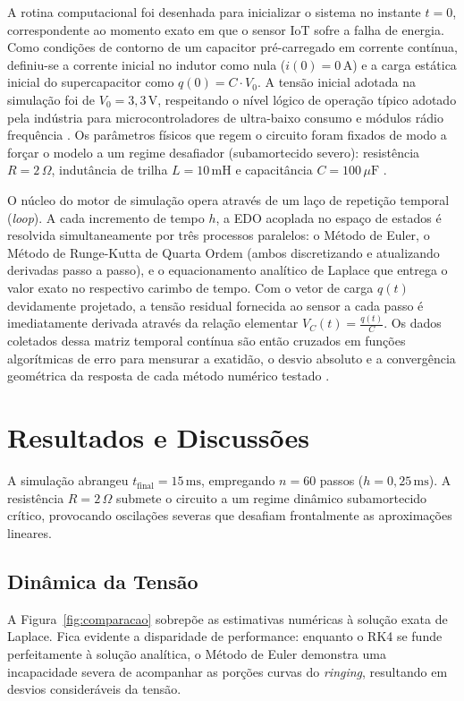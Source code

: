 \documentclass[11pt, a4paper]{article}
\begin{document}
A rotina computacional foi desenhada para inicializar o sistema no instante $t=0$, correspondente ao momento exato em que o sensor IoT sofre a falha de energia. Como condições de contorno de um capacitor pré-carregado em corrente contínua, definiu-se a corrente inicial no indutor como nula ($i(0) = 0\,\text{A}$) e a carga estática inicial do supercapacitor como $q(0) = C \cdot V_0$. A tensão inicial adotada na simulação foi de $V_0 = 3{,}3\,\text{V}$, respeitando o nível lógico de operação típico adotado pela indústria para microcontroladores de ultra-baixo consumo e módulos rádio frequência \cite{sosa2024}. Os parâmetros físicos que regem o circuito foram fixados de modo a forçar o modelo a um regime desafiador (subamortecido severo): resistência $R = 2\,\Omega$, indutância de trilha $L = 10\,\text{mH}$ e capacitância $C = 100\,\mu\text{F}$ \cite{shaikh2022}.

O núcleo do motor de simulação opera através de um laço de repetição temporal (\textit{loop}). A cada incremento de tempo $h$, a EDO acoplada no espaço de estados é resolvida simultaneamente por três processos paralelos: o Método de Euler, o Método de Runge-Kutta de Quarta Ordem (ambos discretizando e atualizando derivadas passo a passo), e o equacionamento analítico de Laplace que entrega o valor exato no respectivo carimbo de tempo. Com o vetor de carga $q(t)$ devidamente projetado, a tensão residual fornecida ao sensor a cada passo é imediatamente derivada através da relação elementar $V_C(t) = \frac{q(t)}{C}$. Os dados coletados dessa matriz temporal contínua são então cruzados em funções algorítmicas de erro para mensurar a exatidão, o desvio absoluto e a convergência geométrica da resposta de cada método numérico testado \cite{igwe2025}.

\section{Resultados e Discussões}

A simulação abrangeu $t_{\text{final}} = 15\,\text{ms}$, empregando $n = 60$ passos ($h = 0{,}25\,\text{ms}$). A resistência $R = 2\,\Omega$ submete o circuito a um regime dinâmico subamortecido crítico, provocando oscilações severas que desafiam frontalmente as aproximações lineares.

\subsection{Dinâmica da Tensão}
A Figura~\ref{fig:comparacao} sobrepõe as estimativas numéricas à solução exata de Laplace. Fica evidente a disparidade de performance: enquanto o RK4 se funde perfeitamente à solução analítica, o Método de Euler demonstra uma incapacidade severa de acompanhar as porções curvas do \textit{ringing}, resultando em desvios consideráveis da tensão.
\end{document}
